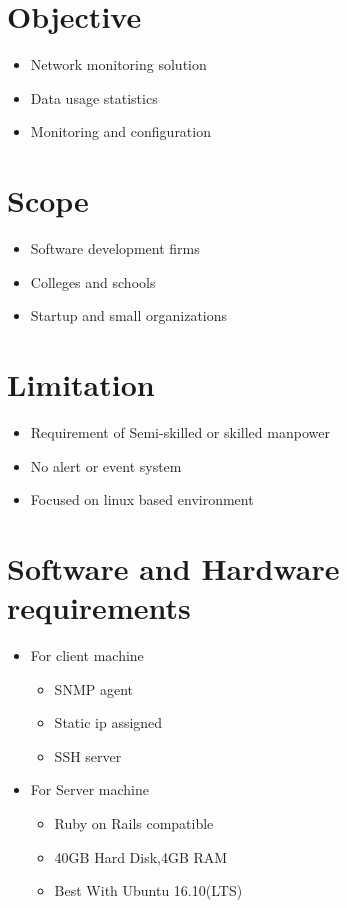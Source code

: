 \documentclass[10pt,article,oneside]{memoir}
\begin{document}
\chapter*{Objective}
\label{sec:org4a83430}
\begin{itemize}
\item Network monitoring solution
\item Data usage statistics
\item Monitoring and configuration
\end{itemize}

\chapter*{Scope}
\label{sec:org9ea4966}
\begin{itemize}
\item Software development firms
\item Colleges and schools
\item Startup and small organizations
\end{itemize}

\chapter*{Limitation}
\label{sec:org5b38218}
\begin{itemize}
\item Requirement of Semi-skilled or skilled manpower
\item No alert or event system
\item Focused on linux based environment
\end{itemize}

\chapter*{Software and Hardware requirements}
\label{sec:org16012b5}
\begin{itemize}
\item For client machine
\begin{itemize}
\item SNMP agent
\item Static ip assigned
\item SSH server
\end{itemize}
\item For Server machine 
\begin{itemize}
\item Ruby on Rails compatible
\item 40GB Hard Disk,4GB RAM
\item Best With Ubuntu 16.10(LTS)
\end{itemize}
\end{itemize}
\end{document}
